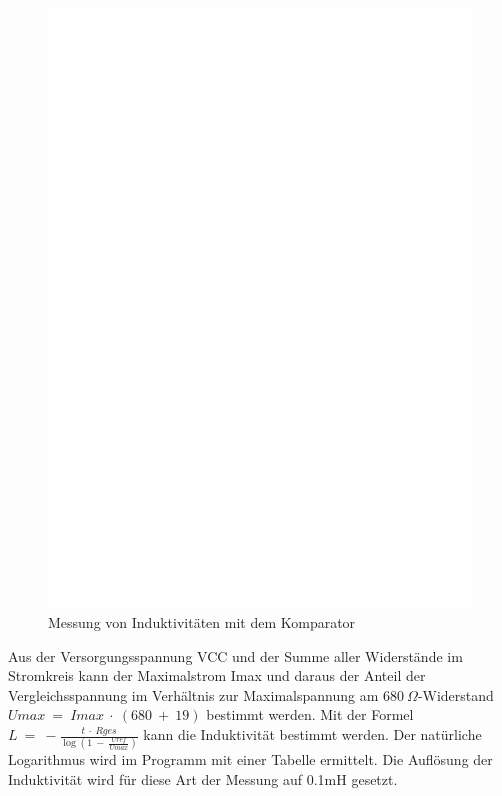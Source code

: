 \begin{figure}[H]
\centering
\includegraphics[]{../FIG/Inductance.eps}
\caption{Messung von Induktivitäten mit dem Komparator}
\label{fig:Inductance}
\end{figure}

Aus der Versorgungsspannung VCC und der Summe aller Widerstände im Stromkreis kann der Maximalstrom Imax und
daraus der Anteil der Vergleichsspannung im Verhältnis zur Maximalspannung am \(680~\Omega\)-Widerstand
\(Umax~=~Imax~\cdot~(680~+~19)\) bestimmt werden.
Mit der Formel \(L~=~-\frac{t~\cdot~Rges}{\log{(1~-~\frac{Uref}{Umax})}}\) kann die Induktivität bestimmt werden.
Der natürliche Logarithmus wird im Programm mit einer Tabelle ermittelt.
Die Auflösung der Induktivität wird für diese Art der Messung auf 0.1mH gesetzt.

